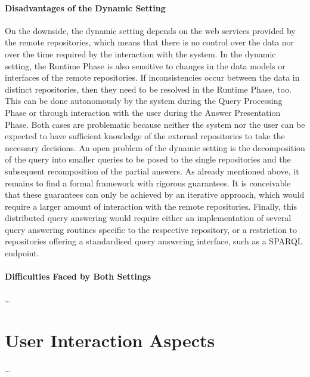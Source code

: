 \paragraph{Disadvantages of the Dynamic Setting}

On the downside, the dynamic setting depends on the web services provided by the remote repositories,
which means that there is no control over the data nor over the time required
by the interaction with the system.
In the dynamic setting, the Runtime Phase is also sensitive to changes in the data models
or interfaces of the remote repositories.
If inconsistencies occur between the data in distinct repositories,
then they need to be resolved in the Runtime Phase, too.
This can be done autonomously by the system during the Query Processing Phase
or through interaction with the user during the Answer Presentation Phase.
Both cases are problematic because neither the system nor the user
can be expected to have sufficient knowledge of the external repositories
to take the necessary decisions.
An open problem of the dynamic setting is the decomposition of the query
into smaller queries to be posed to the single repositories
and the subsequent recomposition of the partial answers.
As already mentioned above, it remains to find a
formal framework with rigorous guarantees.
It is conceivable that these guarantees can only be achieved by an iterative approach,
which would require a larger amount of interaction with the remote repositories.
Finally, this distributed query answering would require either an implementation
of several query answering routines specific to the respective repository,
or a restriction to repositories offering a standardised query answering interface,
such as a \gls{SPARQL} endpoint.

\paragraph{Difficulties Faced by Both Settings}

\dots



\section{User Interaction Aspects}
\label{sec:user_interaction}

\dots



